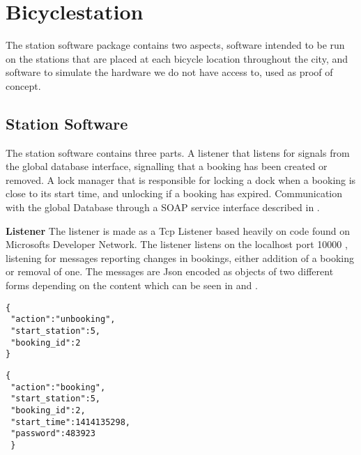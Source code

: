 \section{Bicyclestation}
The station software package contains two aspects, software intended to be run on the stations that are placed at each bicycle location throughout the city, and software to simulate the hardware we do not have access to, used as proof of concept.

\subsection{Station Software}
The station software contains three parts. A listener that listens for signals from the global database interface, signalling that a booking has been created or removed. A lock manager that is responsible for locking a dock when a booking is close to its start time, and unlocking if a booking has expired. Communication with the global Database through a SOAP service interface described in .

\textbf{Listener}
The listener is made as a Tcp Listener based heavily on code found on Microsofts Developer Network\citep{misc:TcpListenerSource}. The listener listens on the localhost port 10000 , listening for messages reporting changes in bookings, either addition of a booking or removal of one. The messages are Json encoded as objects of two different forms depending on the content which can be seen in  and .


\begin{minipage}{\textwidth}
\begin{minipage}{0.45\textwidth}
\begin{lstlisting}[caption = {Unbooking message form}, label = {lst:JsonUnbooking}]
{
 "action":"unbooking",
 "start_station":5,
 "booking_id":2
}
\end{lstlisting}
\end{minipage}
\hspace{0.5cm}
\begin{minipage}{0.45\textwidth}
\begin{lstlisting}[caption = {Booking message form}, label = {lst:JsonBooking}]
{
 "action":"booking",
 "start_station":5,
 "booking_id":2,
 "start_time":1414135298,
 "password":483923
 }
\end{lstlisting}
\end{minipage}
\end{minipage}


